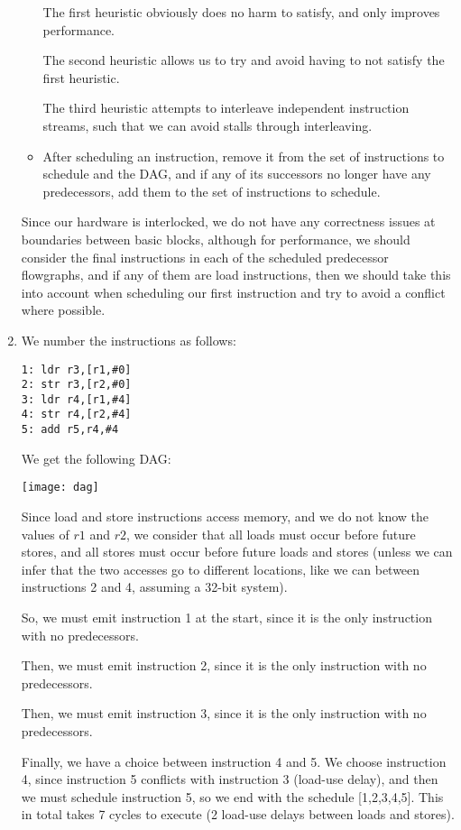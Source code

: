 \begin{enumerate}[label=(\alph*)]
\begin{itemize}
              The first heuristic obviously does no harm to satisfy, and only improves performance.

              The second heuristic allows us to try and avoid having to not satisfy the first heuristic.

              The third heuristic attempts to interleave independent instruction streams, such that we can avoid stalls through interleaving.

              \item
                After scheduling an instruction, remove it from the set of instructions to schedule and the DAG, and if any of its successors no longer have any predecessors, add them to the set of instructions to schedule.
    \end{itemize}

    Since our hardware is interlocked, we do not have any correctness issues at boundaries between basic blocks, although for performance, we should consider the final instructions in each of the scheduled predecessor flowgraphs, and if any of them are load instructions, then we should take this into account when scheduling our first instruction and try to avoid a conflict where possible.

    \item
      We number the instructions as follows:

\begin{verbatim}
1: ldr r3,[r1,#0]
2: str r3,[r2,#0]
3: ldr r4,[r1,#4]
4: str r4,[r2,#4]
5: add r5,r4,#4
\end{verbatim}

We get the following DAG:

\texttt{[image: dag]}

Since load and store instructions access memory, and we do not know the values of $r1$ and $r2$, we consider that all loads must occur before future stores, and all stores must occur before future loads and stores (unless we can infer that the two accesses go to different locations, like we can between instructions 2 and 4, assuming a 32-bit system).

So, we must emit instruction 1 at the start, since it is the only instruction with no predecessors.

Then, we must emit instruction 2, since it is the only instruction with no predecessors.

Then, we must emit instruction 3, since it is the only instruction with no predecessors.

Finally, we have a choice between instruction 4 and 5. We choose instruction 4, since instruction 5 conflicts with instruction 3 (load-use delay), and then we must schedule instruction 5, so we end with the schedule [1,2,3,4,5]. This in total takes 7 cycles to execute (2 load-use delays between loads and stores).


\end{enumerate}
